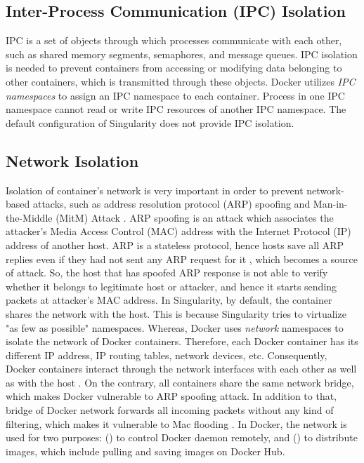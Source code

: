 \subsection{Inter-Process Communication (IPC) Isolation}

IPC is a set of objects through which processes communicate with
each other, such as shared memory segments, semaphores, and message queues.
IPC isolation is needed to prevent containers
from accessing or modifying data belonging to other containers, which is
transmitted through these objects. Docker utilizes \textit{IPC namespaces}
to assign an IPC namespace to each container. Process in one IPC namespace
cannot read or write IPC resources of another IPC namespace.
The default configuration of Singularity does not provide IPC isolation.

\subsection{Network Isolation}


Isolation of container's network is very important in order to prevent
network-based attacks, such as address resolution protocol (ARP)
spoofing and Man-in-the-Middle (MitM) Attack \cite{lockhart2004network}.
ARP spoofing is an attack which associates the attacker's Media Access
Control (MAC) address with the Internet Protocol (IP) address of another host.
ARP is a stateless protocol, hence hosts save all ARP replies even if they had not
sent any ARP request for it \cite{ramachandran2005detecting}, which becomes a
source of attack. So, the host that has spoofed ARP response is not able to
verify whether it belongs to legitimate host or attacker, and hence it starts
sending packets at attacker's MAC address.
In Singularity, by default, the container shares the network with the host.
This is because Singularity tries to virtualize "as few as possible" namespaces.
Whereas, Docker uses \textit{network} namespaces
\cite{NetworkNamespace} to isolate the network of Docker containers.
Therefore, each Docker container has its different IP address,
IP routing tables, network devices, etc. Consequently, Docker containers
interact through the network interfaces with each other as well as with
the host \cite{dockerNetworkdoc}. On the contrary, all containers share
the same network bridge, which makes Docker vulnerable to ARP spoofing attack.
In addition to that, bridge of Docker network forwards all incoming packets
without any kind of filtering, which makes it vulnerable to Mac flooding
\cite{bui2015analysis}.
In Docker, the network is used for two purposes: () to control
Docker daemon remotely, and () to distribute images, which
include pulling and saving images on Docker Hub.

